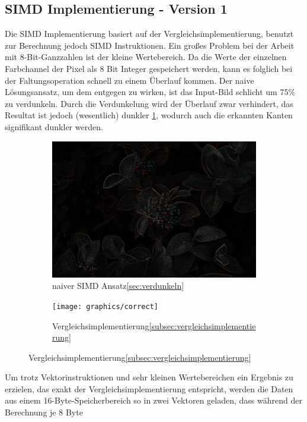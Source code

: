 \documentclass[course=erap]{aspdoc}
\begin{document}
\subsection{SIMD Implementierung - Version 1}
\label{subsec:simd-implementierung}
Die SIMD Implementierung basiert auf der Vergleichsimplementierung, benutzt zur Berechnung jedoch SIMD Instruktionen.
Ein großes Problem bei der Arbeit mit 8-Bit-Ganzzahlen ist der kleine Wertebereich.
Da die Werte der einzelnen Farbchannel der Pixel als 8 Bit Integer gespeichert werden, kann es folglich bei der Faltungsoperation schnell zu einem Überlauf kommen.
Der naive Lösungsansatz, um dem entgegen zu wirken, ist das Input-Bild schlicht um 75\% zu verdunkeln. \label{sec:verdunkeln}
Durch die Verdunkelung wird der Überlauf zwar verhindert, das Resultat ist jedoch (wesentlich) dunkler {\ref{fig:dark}}, wodurch auch die erkannten Kanten signifikant dunkler werden.
\begin{figure}[H]
    \begin{subfigure}{.5\columnwidth}
        \centering
        \includegraphics[width=\columnwidth]{graphics/dark}
        \caption{naiver SIMD Ansatz\ref{sec:verdunkeln}}
        \label{fig:dark}
    \end{subfigure}
    \begin{subfigure}{.5\columnwidth}
        \centering
        \texttt{[image: graphics/correct]}
        \caption{Vergleichsimplementierung\ref{subsec:vergleichsimplementierung}}
        \label{fig:correct}
    \end{subfigure}
\end{figure}
Um trotz Vektorinstruktionen und sehr kleinen Wertebereichen ein Ergebnis zu erzielen,
das exakt der Vergleichsimplementierung entspricht, werden die Daten aus einem 16-Byte-Speicherbereich so in zwei Vektoren geladen, dass während der Berechnung je 8 Byte
\end{document}
